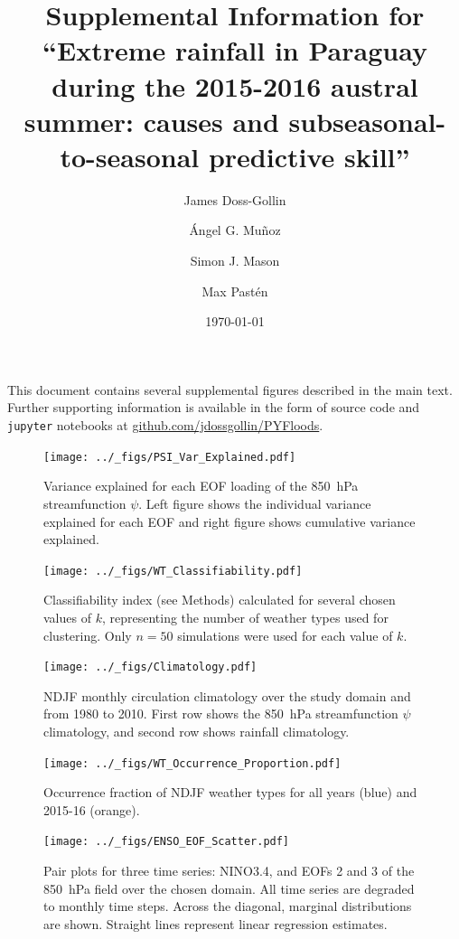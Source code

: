 \documentclass{article}
\title{Supplemental Information for\\``Extreme rainfall in Paraguay during the 2015-2016 austral summer: causes and subseasonal-to-seasonal predictive skill''}
\author{James Doss-Gollin\and \'{A}ngel G. Mu\~{n}oz \and Simon J. Mason \and Max Past\'{e}n}
\date{\today}
\begin{document}
\maketitle

This document contains several supplemental figures described in the main text.
Further supporting information is available in the form of source code and \texttt{jupyter} notebooks at \url{github.com/jdossgollin/PYFloods}.
\listoffigures
\clearpage

\begin{figure}
  \texttt{[image: ../\_figs/PSI\_Var\_Explained.pdf]}
	\caption{
		Variance explained for each EOF loading of the \SI{850}{\hecto\pascal} streamfunction $\psi$.
    Left figure shows the individual variance explained for each EOF and right figure shows cumulative variance explained.
	}
\end{figure}

\begin{figure}
  \texttt{[image: ../\_figs/WT\_Classifiability.pdf]}
	\caption{
		Classifiability index (see Methods) calculated for several chosen values of $k$, representing the number of weather types used for clustering.
		Only $n=50$ simulations were used for each value of $k$.
	}
\end{figure}

\begin{figure}
	\texttt{[image: ../\_figs/Climatology.pdf]}
	\caption{
		NDJF monthly circulation climatology over the study domain and from 1980 to 2010.
    First row shows the \SI{850}{\hecto\pascal} streamfunction $\psi$ climatology, and second row shows rainfall climatology.
	}
\end{figure}



\begin{figure}
  \texttt{[image: ../\_figs/WT\_Occurrence\_Proportion.pdf]}
	\caption{
		Occurrence fraction of NDJF weather types for all years (blue) and 2015-16 (orange).
	}
\end{figure}

\begin{figure}
  \texttt{[image: ../\_figs/ENSO\_EOF\_Scatter.pdf]}
	\caption{
		Pair plots for three time series: NINO3.4, and EOFs 2 and 3 of the \SI{850}{\hecto\pascal} field over the chosen domain.
    All time series are degraded to monthly time steps.
    Across the diagonal, marginal distributions are shown.
    Straight lines represent linear regression estimates.
	}
\end{figure}
\end{document}
